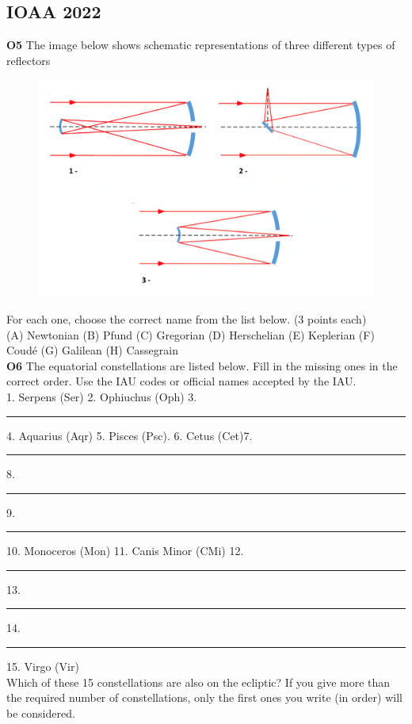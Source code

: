 \documentclass[a4paper,12pt]{extarticle}
\begin{document}
\subsection{IOAA 2022}
\textbf{O5} The image below shows schematic representations of three different types of reflectors
\begin{figure}[H]
	\centering
	\includegraphics[width=0.7\linewidth]{ioaa22_1.png}
\end{figure}
For each one, choose the correct name from the list below. \hfill(3 points each)\\
(A) Newtonian (B) Pfund (C) Gregorian (D) Herschelian (E) Keplerian (F) Coudé (G) Galilean (H) Cassegrain\\

\textbf{O6} The equatorial constellations are listed below. Fill in the missing ones in the correct order. Use the IAU codes or official names accepted by the IAU.\\

1. Serpens (Ser) 2. Ophiuchus (Oph) 3. \rule{1cm}{0.15mm} 4. Aquarius (Aqr) 5. Pisces (Psc).     6. Cetus  (Cet)7.\rule{1cm}{0.15mm}   8. \rule{1cm}{0.15mm} 9. \rule{1cm}{0.15mm} 10. Monoceros (Mon) 11. Canis Minor (CMi) 12. \rule{1cm}{0.15mm} 13. \rule{1cm}{0.15mm} 14. \rule{1cm}{0.15mm} 15. Virgo (Vir)\\

Which of these 15 constellations are also on the ecliptic? If you give more than the required number of constellations, only the first ones you write (in order) will be considered.\\
\end{document}
